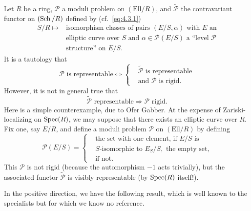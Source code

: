 \kmitem\label{item:A.4.1}
Let $R$ be a ring, $\mathcal{P}$ a moduli problem on $(\mathrm{Ell}/R)$, and $\widetilde{\mathcal{P}}$ the contravariant functor on $(\operatorname{Sch}/R)$ defined by (cf.\ \ref{eq:4.3.1})
\begin{equation}\label{eq:A.4.1.1}
\begin{aligned}
S/R \longmapsto {} & \text{isomorphism classes of pairs } (E/S, \alpha) \text{ with } E \text{ an} \\
& \text{elliptic curve over } S \text{ and } \alpha \in \mathcal{P}(E/S) \text{ a ``level } \mathcal{P} \\
& \text{structure'' on } E/S.
\end{aligned}
\end{equation}
It is a tautology that
\begin{equation}\label{eq:A.4.1.2}
\mathcal{P} \text{ is representable} \Longleftrightarrow
\left\{
\begin{aligned}
& \widetilde{\mathcal{P}} \text{ is representable} \\
& \text{and } \mathcal{P} \text{ is rigid.}
\end{aligned}
\right.
\end{equation}
However, it is not in general true that
\[
\widetilde{\mathcal{P}} \text{ representable} \Longrightarrow \mathcal{P} \text{ rigid.}
\]
Here is a simple counterexample, due to Ofer Gabber. At the expense of Zariski-localizing on $\operatorname{Spec}(R)$, we may suppose that there exists an elliptic curve over $R$. Fix one, say $E/R$, and define a moduli problem $\mathcal{P}$ on $(\mathrm{Ell}/R)$ by defining
\begin{equation}\label{eq:A.4.1.3}
\mathcal{P}(E/S) = \left\{
\begin{aligned}
& \text{the set with one element, if } E/S \text{ is} \\
& S\text{-isomorphic to } E_S/S, \text{ the empty set,} \\
& \text{if not.}
\end{aligned}
\right.
\end{equation}
This $\mathcal{P}$ is not rigid (because the automorphism $-1$ acts trivially), but the associated functor $\widetilde{\mathcal{P}}$ is visibly representable (by $\operatorname{Spec}(R)$ itself!).

In the positive direction, we have the following result, which is well known to the specialists but for which we know no reference.

